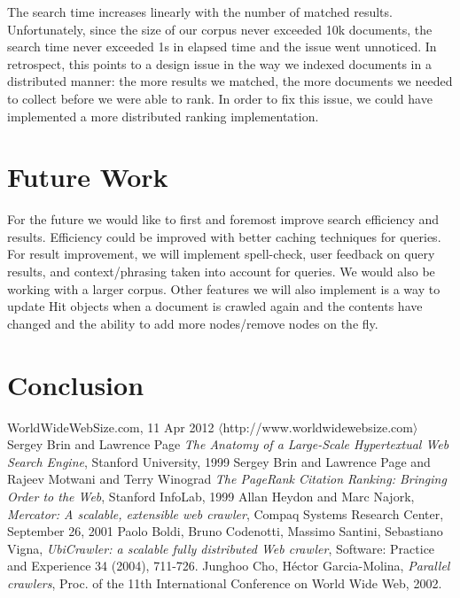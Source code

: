 \documentclass[11pt, letterpaper, oneside, twocolumn]{article}
\begin{document}
The search time increases linearly with the number of matched results. 
Unfortunately, since the size of our corpus never exceeded 10k documents, the search time never exceeded 1s in elapsed time and the issue went unnoticed. 
In retrospect, this points to a design issue in the way we indexed documents in a distributed manner: the more results we matched, the more documents we needed to collect before we were able to rank. 
In order to fix this issue, we could have implemented a more distributed ranking implementation.

\section{Future Work}
\label{sec:future}
For the future we would like to first and foremost improve search efficiency and results. 
Efficiency could be improved with better caching techniques for queries. 
For result improvement, we will implement spell-check, user feedback on query results, and context/phrasing taken into account for queries. 
We would also be working with a larger corpus.
Other features we will also implement is a way to update Hit objects when a document is crawled again and the contents have changed and the ability to add more nodes/remove nodes on the fly. 


\section{Conclusion}
\label{sec:conculsion}

\begin{thebibliography}{9}

   WorldWideWebSize.com, 11 Apr 2012 $\langle$http://www.worldwidewebsize.com$\rangle$
   Sergey Brin and Lawrence Page \emph{The Anatomy of a Large-Scale Hypertextual Web Search Engine}, Stanford University, 1999
   Sergey Brin and  Lawrence Page and Rajeev Motwani and Terry Winograd \emph{The PageRank Citation Ranking: Bringing Order to the Web}, Stanford InfoLab, 1999
   Allan Heydon and Marc Najork, \emph{Mercator: A scalable, extensible web crawler}, Compaq Systems Research Center, September 26, 2001
   Paolo Boldi, Bruno Codenotti, Massimo Santini, Sebastiano Vigna, \emph{UbiCrawler: a scalable fully distributed Web crawler}, Software: Practice and Experience 34 (2004), 711-726.
   Junghoo Cho, H\'{e}ctor Garcia-Molina, \emph{Parallel crawlers}, Proc. of the 11th International Conference on World Wide Web, 2002.


\end{thebibliography}
\end{document}
